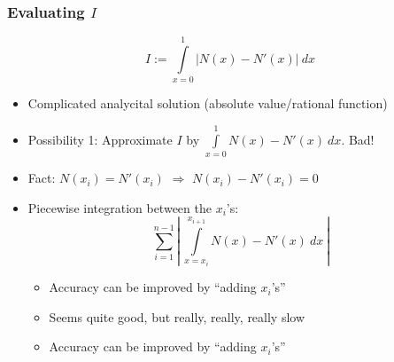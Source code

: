 \documentclass{beamer}
\begin{document}
\begin{frame}
  \frametitle{Evaluating $I$}
  \begin{equation*}
    I := \int\limits_{x=0}^1 | N(x) - N'(x) |\ dx
  \end{equation*}
  \begin{itemize}
  \item Complicated analycital solution (absolute value/rational function)
  \item Possibility 1: Approximate $I$ by $\int\limits_{x=0}^1 N(x) - N'(x) \  dx$. Bad!
  \item Fact: $N(x_i) = N'(x_i)$ 
    $\Rightarrow$ $N(x_i) - N'(x_i) = 0$
  \item Piecewise integration between the $x_i$'s:
    \begin{equation*}
      \sum\limits_{i=1}^{n-1} \left|\ \int\limits_{x=x_i}^{x_{i+1}} N(x) - N'(x) \  dx\ \right|
    \end{equation*}
    \begin{itemize}
    \item Accuracy can be improved by ``adding $x_i$'s''
    \item Seems quite good, but really, really, really slow
    \item Accuracy can be improved by ``adding $x_i$'s''
    \end{itemize}
  \end{itemize}
\end{frame}
\end{document}
